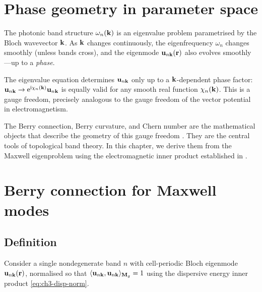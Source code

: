 
\section{Phase geometry in parameter space}
\label{sec:ch5-phase-geometry}

The photonic band structure $\omega_n(\mathbf{k})$ is an eigenvalue problem
parametrised by the Bloch wavevector $\mathbf{k}$.  As $\mathbf{k}$ changes
continuously, the eigenfrequency $\omega_n$ changes smoothly (unless
bands cross), and the eigenmode $\mathbf{u}_{n\mathbf{k}}(\mathbf{r})$
also evolves smoothly---up to a \emph{phase}.

The eigenvalue equation determines $\mathbf{u}_{n\mathbf{k}}$ only up to a
$\mathbf{k}$-dependent phase factor:
$\mathbf{u}_{n\mathbf{k}}\to\mathrm{e}^{\mathrm{i}\chi_n(\mathbf{k})}\mathbf{u}_{n\mathbf{k}}$ is
equally valid for any smooth real function $\chi_n(\mathbf{k})$.  This is a
gauge freedom, precisely analogous to the gauge freedom of the vector
potential in electromagnetism.

The Berry connection, Berry curvature, and Chern number are the
mathematical objects that describe the geometry of this gauge freedom
\cite{raghu2008analogs,zhao2020first,lee2022calculation}.
They are the central tools of topological band theory.  In this chapter,
we derive them from the Maxwell eigenproblem using the electromagnetic
inner product established in .

\section{Berry connection for Maxwell modes}
\label{sec:ch5-berry-connection}

\subsection{Definition}
\label{sec:ch5-bc-definition}

Consider a single nondegenerate band $n$ with cell-periodic Bloch
eigenmode $\mathbf{u}_{n\mathbf{k}}(\mathbf{r})$, normalised so that
$\langle \mathbf{u}_{n\mathbf{k}} , \mathbf{u}_{n\mathbf{k}} \rangle_{\mathbf{M}_g}=1$ using the dispersive
energy inner product \eqref{eq:ch3-disp-norm}.

